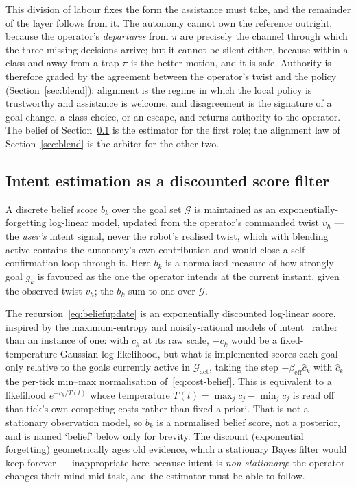 \documentclass[12pt,a4paper,twoside,openright]{report}
\begin{document}
This division of labour fixes the form the assistance must take, and the remainder of the layer follows from it. The autonomy cannot own the reference outright, because the operator's \emph{departures} from $\pi$ are precisely the channel through which the three missing decisions arrive; but it cannot be silent either, because within a class and away from a trap $\pi$ is the better motion, and it is safe. Authority is therefore graded by the agreement between the operator's twist and the policy (Section~\ref{sec:blend}): alignment is the regime in which the local policy is trustworthy and assistance is welcome, and disagreement is the signature of a goal change, a class choice, or an escape, and returns authority to the operator. The belief of Section~\ref{sec:belief} is the estimator for the first role; the alignment law of Section~\ref{sec:blend} is the arbiter for the other two.

\subsection{Intent estimation as a discounted score filter}
\label{sec:belief}

A discrete belief score $b_k$ over the goal set $\mathcal{G}$ is maintained as an exponentially-forgetting log-linear model, updated from the operator's commanded twist $v_h$ --- the \emph{user's} intent signal, never the robot's realised twist, which with blending active contains the autonomy's own contribution and would close a self-confirmation loop through it. Here $b_k$ is a normalised measure of how strongly goal $g_k$ is favoured as the one the operator intends at the current instant, given the observed twist $v_h$; the $b_k$ sum to one over $\mathcal{G}$.

The recursion~\eqref{eq:beliefupdate} is an exponentially discounted log-linear score, inspired by the maximum-entropy and noisily-rational models of intent~\cite{ziebart2008maxent,baker2009action,dragan2013policy} rather than an instance of one: with $c_k$ at its raw scale, $-c_k$ would be a fixed-temperature Gaussian log-likelihood, but what is implemented scores each goal only relative to the goals currently active in $\mathcal{G}_{\text{act}}$, taking the step $-\beta_{\text{eff}}\hat{c}_k$ with $\hat{c}_k$ the per-tick min--max normalisation of~\eqref{eq:cost-belief}. This is equivalent to a likelihood $e^{-c_k/T(t)}$ whose temperature $T(t) = \max_j c_j - \min_j c_j$ is read off that tick's own competing costs rather than fixed a priori. That is not a stationary observation model, so $b_k$ is a normalised belief score, not a posterior, and is named `belief' below only for brevity. The discount (exponential forgetting) geometrically ages old evidence, which a stationary Bayes filter would keep forever --- inappropriate here because intent is \emph{non-stationary}: the operator changes their mind mid-task, and the estimator must be able to follow.
\end{document}
